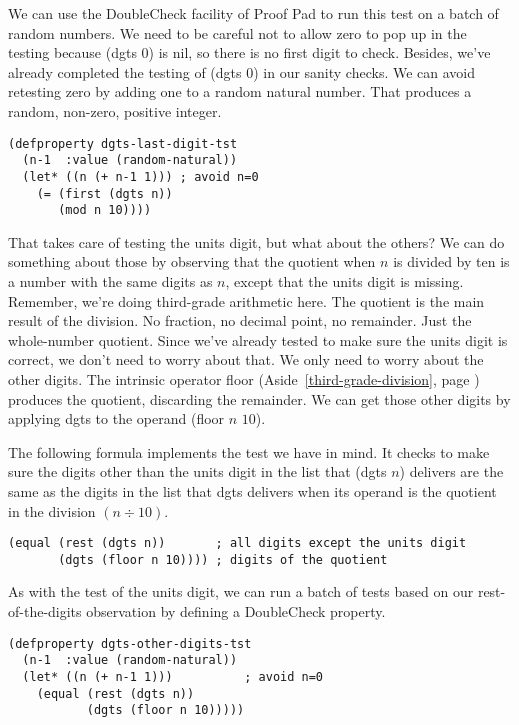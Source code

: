 We can use the DoubleCheck facility of Proof Pad to run this test on a batch of random numbers.
We need to be careful not to allow zero to pop up in the testing
because \textsf{(dgts 0)} is nil, so there is no first digit to check.
Besides, we've already completed the testing of \textsf{(dgts 0)} in our sanity checks.
We can avoid retesting zero by adding one to a random natural number.
That produces a random, non-zero, positive integer.
\begin{Verbatim}
(defproperty dgts-last-digit-tst
  (n-1  :value (random-natural))
  (let* ((n (+ n-1 1))) ; avoid n=0
    (= (first (dgts n))
       (mod n 10))))
\end{Verbatim}

That takes care of testing the units digit, but what about the others?
We can do something about those by observing that the quotient
when $n$ is divided by ten
is a number with the same digits as $n$,
except that the units digit is missing.
Remember, we're doing third-grade arithmetic here.
The quotient is the main result of the division.
No fraction, no decimal point, no remainder. Just the whole-number quotient.
Since we've already tested to make sure the units digit is correct,
we don't need to worry about that.
We only need to worry about the other digits.
The intrinsic operator \textsf{floor}
(Aside~\ref{third-grade-division}, page \pageref{third-grade-division})
produces the quotient, discarding the remainder.
We can get those other digits by applying \textsf{dgts} to
the operand \textsf{(floor $n$ $10$)}.

The following formula implements the test we have in mind.
It checks to make sure the digits other than the units digit
in the list that \textsf{(dgts $n$)} delivers
are the same as the digits in the list that
\textsf{dgts} delivers when its operand is the quotient in
the division $(n \div 10)$.
\begin{Verbatim}
(equal (rest (dgts n))       ; all digits except the units digit
       (dgts (floor n 10)))) ; digits of the quotient
\end{Verbatim}

As with the test of the units digit,
we can run a batch of tests based on our rest-of-the-digits
observation by defining a DoubleCheck property.
\begin{Verbatim}
(defproperty dgts-other-digits-tst
  (n-1  :value (random-natural))
  (let* ((n (+ n-1 1)))          ; avoid n=0
    (equal (rest (dgts n))
           (dgts (floor n 10)))))
\end{Verbatim}

